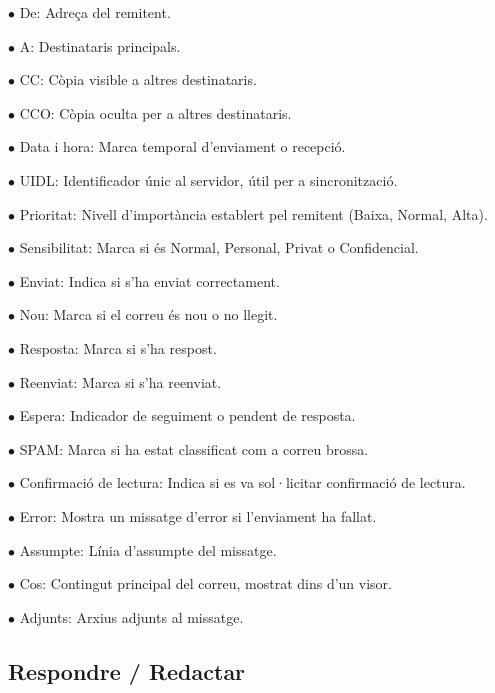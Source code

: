 \documentclass[a4paper]{article}
\begin{document}
\begin{compactitem}
\item[\color{myblue}$\bullet$] De: Adreça del remitent.
\item[\color{myblue}$\bullet$] A: Destinataris principals.
\item[\color{myblue}$\bullet$] CC: Còpia visible a altres destinataris.
\item[\color{myblue}$\bullet$] CCO: Còpia oculta per a altres destinataris.
\item[\color{myblue}$\bullet$] Data i hora: Marca temporal d'enviament o recepció.
\item[\color{myblue}$\bullet$] UIDL: Identificador únic al servidor, útil per a sincronització.
\item[\color{myblue}$\bullet$] Prioritat: Nivell d'importància establert pel remitent (Baixa, Normal, Alta).
\item[\color{myblue}$\bullet$] Sensibilitat: Marca si és Normal, Personal, Privat o Confidencial.
\item[\color{myblue}$\bullet$] Enviat: Indica si s'ha enviat correctament.
\item[\color{myblue}$\bullet$] Nou: Marca si el correu és nou o no llegit.
\item[\color{myblue}$\bullet$] Resposta: Marca si s'ha respost.
\item[\color{myblue}$\bullet$] Reenviat: Marca si s'ha reenviat.
\item[\color{myblue}$\bullet$] Espera: Indicador de seguiment o pendent de resposta.
\item[\color{myblue}$\bullet$] SPAM: Marca si ha estat classificat com a correu brossa.
\item[\color{myblue}$\bullet$] Confirmació de lectura: Indica si es va sol·licitar confirmació de lectura.
\item[\color{myblue}$\bullet$] Error: Mostra un missatge d'error si l'enviament ha fallat.
\item[\color{myblue}$\bullet$] Assumpte: Línia d'assumpte del missatge.
\item[\color{myblue}$\bullet$] Cos: Contingut principal del correu, mostrat dins d'un visor.
\item[\color{myblue}$\bullet$] Adjunts: Arxius adjunts al missatge.
\end{compactitem}

\hypertarget{toc94}{}
\subsection{Respondre / Redactar}
\end{document}
